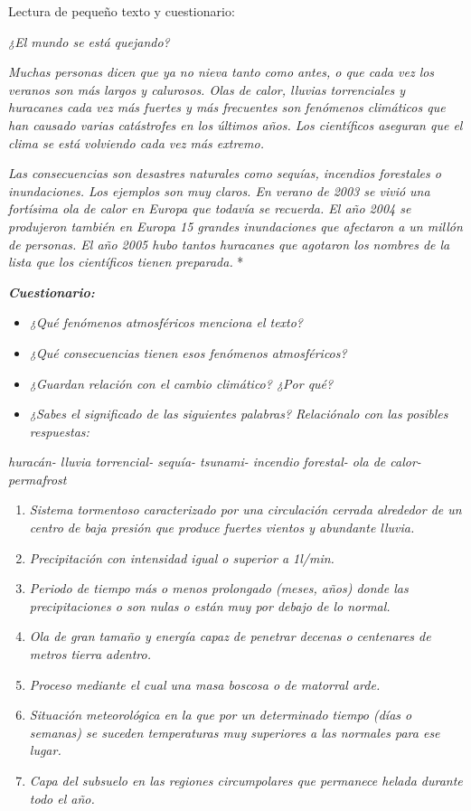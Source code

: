 \documentclass[
]{article}
\providecommand{\tightlist}{%
  \setlength{\itemsep}{0pt}\setlength{\parskip}{0pt}}
\begin{document}
Lectura de pequeño texto y cuestionario:

\emph{¿El mundo se está quejando?}

\emph{Muchas personas dicen que ya no nieva tanto como antes, o que cada
vez los veranos son más largos y calurosos. Olas de calor, lluvias
torrenciales y huracanes cada vez más fuertes y más frecuentes son
fenómenos climáticos que han causado varias catástrofes en los últimos
años. Los científicos aseguran que el clima se está volviendo cada vez
más extremo.}

\emph{Las consecuencias son desastres naturales como sequías, incendios
forestales o inundaciones. Los ejemplos son muy claros. En verano de
2003 se vivió una fortísima ola de calor en Europa que todavía se
recuerda. El año 2004 se produjeron también en Europa 15 grandes
inundaciones que afectaron a un millón de personas. El año 2005 hubo
tantos huracanes que agotaron los nombres de la lista que los
científicos tienen preparada.} *

\textbf{\emph{Cuestionario:}}

\begin{itemize}
\tightlist
\item
  \emph{¿Qué fenómenos atmosféricos menciona el texto?}
\item
  \emph{¿Qué consecuencias tienen esos fenómenos atmosféricos?}
\item
  \emph{¿Guardan relación con el cambio climático? ¿Por qué?}
\item
  \emph{¿Sabes el significado de las siguientes palabras? Relaciónalo
  con las posibles respuestas:}
\end{itemize}

\texttt{}\emph{huracán- lluvia torrencial- sequía- tsunami- incendio
forestal- ola de calor- permafrost}

\begin{enumerate}
\def\labelenumi{\arabic{enumi}.}
\tightlist
\item
  \emph{Sistema tormentoso caracterizado por una circulación cerrada
  alrededor de un centro de baja presión que produce fuertes vientos y
  abundante lluvia.}
\item
  \emph{Precipitación con intensidad igual o superior a 1l/min.}
\item
  \emph{Periodo de tiempo más o menos prolongado (meses, años) donde las
  precipitaciones o son nulas o están muy por debajo de lo normal.}
\item
  \emph{Ola de gran tamaño y energía capaz de penetrar decenas o
  centenares de metros tierra adentro.}
\item
  \emph{Proceso mediante el cual una masa boscosa o de matorral arde.}
\item
  \emph{Situación meteorológica en la que por un determinado tiempo
  (días o semanas) se suceden temperaturas muy superiores a las normales
  para ese lugar.}
\item
  \emph{Capa del subsuelo en las regiones circumpolares que permanece
  helada durante todo el año.}
\end{enumerate}
\end{document}
